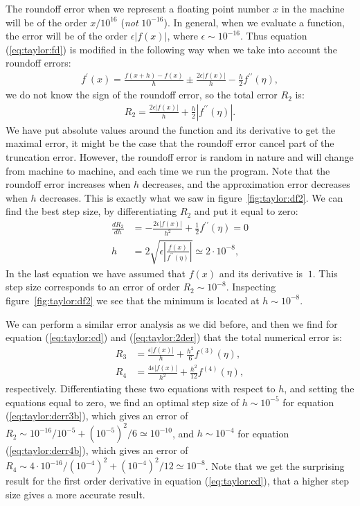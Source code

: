 \documentclass[graybox,sectrefs,envcountresetchap,open=right,final]{svmonodo}
\begin{document}
The roundoff error when we represent a floating point number $x$ in the 
machine will be of the order $x/10^{16}$ (\emph{not} $10^{-16}$). In general, when we evaluate a function, the error will be of the order 
$\epsilon|f(x)|$, where $\epsilon\sim10^{-16}$. Thus equation (\ref{eq:taylor:fd}) is modified in the following way when we take into account the roundoff errors:
\begin{align}
f^\prime(x)=\frac{f(x+h)-f(x)}{h}\pm\frac{2\epsilon|f(x)|}{h}-\frac{h}{2}f^{\prime\prime}(\eta),\label{eq:taylor:derr2}
\end{align}
we do not know the sign of the roundoff error, so the total error $R_2$ is:
\begin{align}
R_2=\frac{2\epsilon|f(x)|}{h}+\frac{h}{2}|f^{\prime\prime}(\eta)|.\label{eq:taylor:derr3}
\end{align}
We have put absolute values around the function and its derivative to get the maximal error, it might be the case that the roundoff error cancel part of the 
truncation error. However, the roundoff error is random in nature and will change from machine to machine, and each time we run the program. 
Note that the roundoff error increases when $h$ decreases, and the approximation error decreases when $h$ decreases. This is exactly what we saw in figure~\ref{fig:taylor:df2}. We can find the 
best step size, by differentiating $R_2$ and put it equal to zero:
\begin{align}
\frac{dR_2}{dh}&=-\frac{2\epsilon|f(x)|}{h^2}+\frac{1}{2}f^{\prime\prime}(\eta)=0\nonumber\\ 
h&=2\sqrt{\epsilon\left|\frac{f(x)}{f^{\prime\prime}(\eta)}\right|}\simeq 2\cdot10^{-8},\label{eq:taylor:derr4}
\end{align}
In the last equation we have assumed that $f(x)$ and its derivative is $~1$. This step size corresponds to an error of order $R_2\sim10^{-8}$. 
Inspecting figure~\ref{fig:taylor:df2} we see that the minimum is located at $h\sim10^{-8}$.      

We can perform a similar error analysis as we did before, and then we find for equation (\ref{eq:taylor:cd}) and (\ref{eq:taylor:2der}) that the total
numerical error is:
\begin{align}
R_3&=\frac{\epsilon|f(x)|}{h}+\frac{h^2}{6}f^{(3)}(\eta),\label{eq:taylor:derr3b}\\ 
R_4&=\frac{4\epsilon|f(x)|}{h^2}+\frac{h^2}{12}f^{(4)}(\eta),\label{eq:taylor:derr4b}
\end{align}
respectively. Differentiating these two equations with respect to $h$, and setting the equations equal to zero, we find an optimal step size of
$h\sim10^{-5}$ for equation (\ref{eq:taylor:derr3b}), which gives an error of $R_2\sim 10^{-16}/10^{-5}+(10^{-5})^2/6\simeq10^{-10}$, and $h\sim10^{-4}$ for equation
(\ref{eq:taylor:derr4b}), which gives an error of $R_4\sim 4\cdot10^{-16}/(10^{-4})^2+(10^{-4})^2/12\simeq10^{-8}$. Note that we get the surprising result for the first order 
derivative in equation (\ref{eq:taylor:cd}), that a higher step size gives a more accurate result. 
\end{document}
